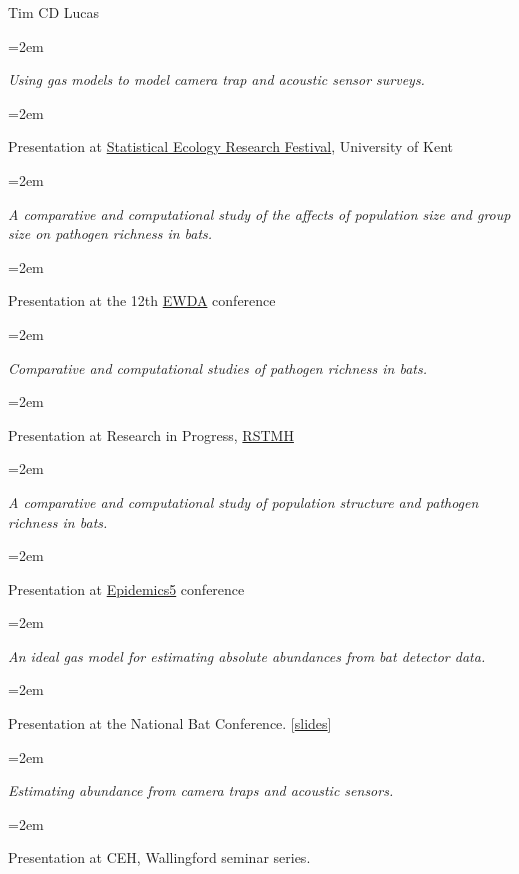 \documentclass{scrartcl}
\newcommand{\MarginText}[1]{\marginpar{\raggedleft\itshape\small#1}} %
\newcommand{\Description}[1]{\hangindent=2em\hangafter=0\noindent\raggedright\footnotesize{#1}\par\normalsize\vspace{1em}} %
\newcommand{\MoreDescription}[1]{\hangindent=2em\hangafter=0\noindent\raggedright\scriptsize{#1}\par\normalsize\vspace{1em}} %
\begin{document}
\begin{cv}{Tim {\Large CD} Lucas}
{\color{Maroon}}\vspace{1em}


\Description{\MarginText{2016}\emph{Using gas models to model camera trap and acoustic sensor surveys.}}\vspace{-1em}
\MoreDescription{Presentation at \href{https://www.kent.ac.uk/smsas/statistics/research/seak-news.html?view=232}{Statistical Ecology Research Festival}, University of Kent}
\vspace{-0.5em}

\Description{\emph{A comparative and computational study of the affects of population size and group size on pathogen richness in bats.}}\vspace{-1em}
\MoreDescription{Presentation at the 12th \href{http://www.izw-berlin.de/EWDA-Conference-European-Wildlife-Disease-Association.html}{EWDA} conference}

\vspace{-0.5em}


\Description{\MarginText{2015}\emph{Comparative and computational studies of pathogen richness in bats.}}\vspace{-1em}
\MoreDescription{Presentation at Research in Progress, \href{https://rstmh.org/events/research-progress-2015}{RSTMH}}

\vspace{-0.5em}

\Description{\emph{A comparative and computational study of population structure and pathogen richness in bats.}}\vspace{-1em}
\MoreDescription{Presentation at \href{http://www.epidemics.elsevier.com/}{Epidemics5} conference}

\vspace{-0.5em}



\Description{\emph{An ideal gas model for estimating absolute abundances from bat detector data.}}\vspace{-1em}
\MoreDescription{Presentation at the National Bat Conference. [\href{http://www.slideshare.net/timcdlucas/tim-lucasnbc}{slides}]}


\vspace{-0.5em}

\Description{\emph{Estimating abundance from camera traps and acoustic sensors.}}\vspace{-1em}
\MoreDescription{Presentation at {\footnotesize CEH}, Wallingford seminar series.}



\end{cv}
\end{document}
